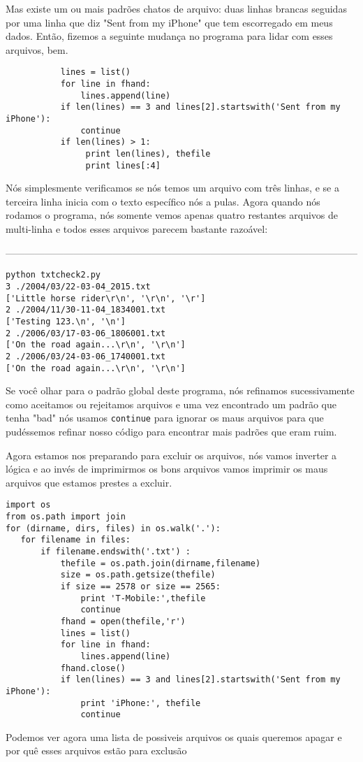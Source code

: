\documentclass{book}
\begin{document}
Mas existe um ou mais padrões chatos de arquivo:
duas linhas brancas seguidas por uma linha que diz "Sent from my iPhone" que tem escorregado em meus dados.
Então, fizemos a seguinte mudança no programa para lidar com esses arquivos, bem.

\begin{verbatim}
           lines = list()
           for line in fhand:
               lines.append(line)
           if len(lines) == 3 and lines[2].startswith('Sent from my iPhone'):
               continue
           if len(lines) > 1:
                print len(lines), thefile
                print lines[:4]
\end{verbatim}

%

Nós simplesmente verificamos se nós temos um arquivo com três linhas, e se a terceira linha inicia com o texto específico 
nós a pulas. Agora quando nós rodamos o programa, nós somente vemos apenas quatro restantes
arquivos de multi-linha e todos esses arquivos parecem bastante razoável:

------------------------------------------------------------------------------------------------------------

\begin{verbatim}
python txtcheck2.py 
3 ./2004/03/22-03-04_2015.txt
['Little horse rider\r\n', '\r\n', '\r']
2 ./2004/11/30-11-04_1834001.txt
['Testing 123.\n', '\n']
2 ./2006/03/17-03-06_1806001.txt
['On the road again...\r\n', '\r\n']
2 ./2006/03/24-03-06_1740001.txt
['On the road again...\r\n', '\r\n']
\end{verbatim}

%

Se você olhar para o padrão global deste programa, nós refinamos sucessivamente como aceitamos ou rejeitamos arquivos e uma vez encontrado um padrão que tenha "bad" nós usamos {\tt continue} para ignorar os maus arquivos para que pudéssemos refinar nosso código para encontrar mais padrões que eram ruim.

Agora estamos nos preparando para excluir os arquivos, nós vamos inverter a lógica e ao invés de imprimirmos os bons arquivos
vamos imprimir os maus arquivos que estamos prestes a excluir.

\begin{verbatim}
import os
from os.path import join
for (dirname, dirs, files) in os.walk('.'):
   for filename in files:
       if filename.endswith('.txt') :
           thefile = os.path.join(dirname,filename)
           size = os.path.getsize(thefile)
           if size == 2578 or size == 2565:
               print 'T-Mobile:',thefile
               continue
           fhand = open(thefile,'r')
           lines = list()
           for line in fhand:
               lines.append(line)
           fhand.close()
           if len(lines) == 3 and lines[2].startswith('Sent from my iPhone'):
               print 'iPhone:', thefile
               continue
\end{verbatim}
%
Podemos ver agora uma lista de possiveis arquivos os quais queremos apagar e por quê esses arquivos estão
para exclusão
\end{document}
